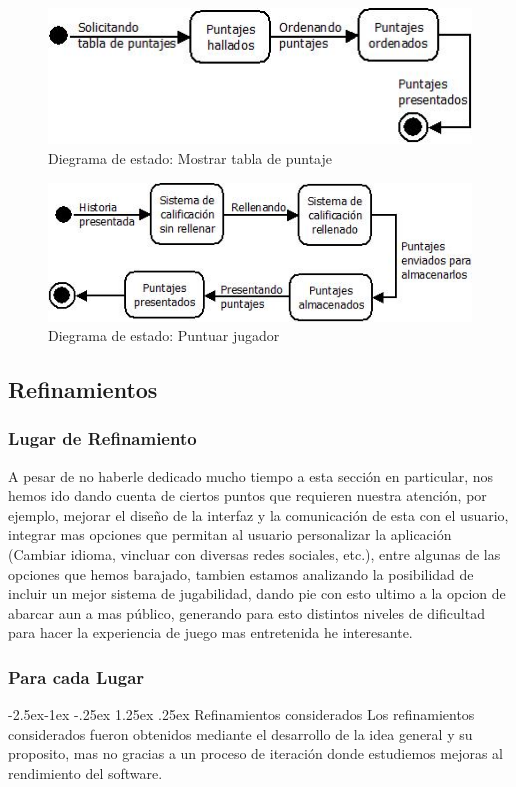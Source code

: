 \documentclass[12pt]{article}
\makeatletter
\renewcommand\paragraph{\@startsection{paragraph}{4}{\z@}%
	{-2.5ex\@plus -1ex \@minus -.25ex}%
	{1.25ex \@plus .25ex}%
	{\normalfont\normalsize\bfseries}}
\makeatother
\begin{document}
\begin{figure}[H]
	\centering
	\includegraphics[scale=1]{imgs/DiagramaEstado5.png}
	\caption{Diegrama de estado: Mostrar tabla de puntaje}
\end{figure}

\begin{figure}[H]
	\centering
	\includegraphics[scale=1]{imgs/DiagramaEstado6.png}
	\caption{Diegrama de estado: Puntuar jugador}
\end{figure}
\subsection{Refinamientos}
\subsubsection{Lugar de Refinamiento}
A pesar de no haberle dedicado mucho tiempo a esta sección en particular, nos hemos ido dando cuenta de ciertos puntos que requieren nuestra atención, por ejemplo, mejorar el diseño de la interfaz y la comunicación de esta con el usuario, integrar mas opciones que permitan al usuario personalizar la aplicación (Cambiar idioma, vincluar con diversas redes sociales, etc.), entre algunas de las opciones que hemos barajado, tambien estamos analizando la posibilidad de incluir un mejor sistema de jugabilidad, dando pie con esto ultimo a la opcion de abarcar aun a mas público, generando para esto distintos niveles de dificultad para hacer la experiencia de juego mas entretenida he interesante.
\subsubsection{Para cada Lugar}
\paragraph{Refinamientos considerados}
Los refinamientos considerados fueron obtenidos mediante el desarrollo de la idea general y su proposito, mas no gracias a un proceso de iteración donde estudiemos mejoras al rendimiento del software.
\end{document}
